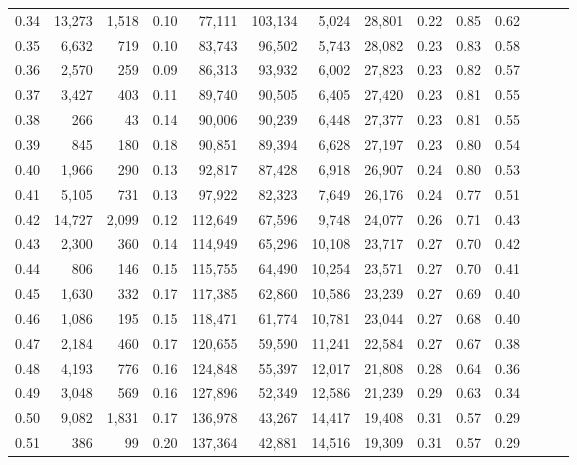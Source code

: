 \begin{tabular}{rrrrrrrrrrrrrr}
0.34 &  13,273 &  1,518 &  0.10 &   77,111 &  103,134 &   5,024 &  28,801 &  0.22 &  0.85 &      0.62 \\
0.35 &   6,632 &    719 &  0.10 &   83,743 &   96,502 &   5,743 &  28,082 &  0.23 &  0.83 &      0.58 \\
0.36 &   2,570 &    259 &  0.09 &   86,313 &   93,932 &   6,002 &  27,823 &  0.23 &  0.82 &      0.57 \\
0.37 &   3,427 &    403 &  0.11 &   89,740 &   90,505 &   6,405 &  27,420 &  0.23 &  0.81 &      0.55 \\
0.38 &     266 &     43 &  0.14 &   90,006 &   90,239 &   6,448 &  27,377 &  0.23 &  0.81 &      0.55 \\
0.39 &     845 &    180 &  0.18 &   90,851 &   89,394 &   6,628 &  27,197 &  0.23 &  0.80 &      0.54 \\
0.40 &   1,966 &    290 &  0.13 &   92,817 &   87,428 &   6,918 &  26,907 &  0.24 &  0.80 &      0.53 \\
0.41 &   5,105 &    731 &  0.13 &   97,922 &   82,323 &   7,649 &  26,176 &  0.24 &  0.77 &      0.51 \\
0.42 &  14,727 &  2,099 &  0.12 &  112,649 &   67,596 &   9,748 &  24,077 &  0.26 &  0.71 &      0.43 \\
0.43 &   2,300 &    360 &  0.14 &  114,949 &   65,296 &  10,108 &  23,717 &  0.27 &  0.70 &      0.42 \\
0.44 &     806 &    146 &  0.15 &  115,755 &   64,490 &  10,254 &  23,571 &  0.27 &  0.70 &      0.41 \\
0.45 &   1,630 &    332 &  0.17 &  117,385 &   62,860 &  10,586 &  23,239 &  0.27 &  0.69 &      0.40 \\
0.46 &   1,086 &    195 &  0.15 &  118,471 &   61,774 &  10,781 &  23,044 &  0.27 &  0.68 &      0.40 \\
0.47 &   2,184 &    460 &  0.17 &  120,655 &   59,590 &  11,241 &  22,584 &  0.27 &  0.67 &      0.38 \\
0.48 &   4,193 &    776 &  0.16 &  124,848 &   55,397 &  12,017 &  21,808 &  0.28 &  0.64 &      0.36 \\
0.49 &   3,048 &    569 &  0.16 &  127,896 &   52,349 &  12,586 &  21,239 &  0.29 &  0.63 &      0.34 \\
0.50 &   9,082 &  1,831 &  0.17 &  136,978 &   43,267 &  14,417 &  19,408 &  0.31 &  0.57 &      0.29 \\
0.51 &     386 &     99 &  0.20 &  137,364 &   42,881 &  14,516 &  19,309 &  0.31 &  0.57 &      0.29 \\

\end{tabular}
